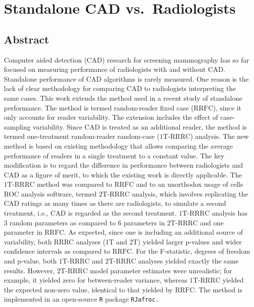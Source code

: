 \documentclass[
]{article}
\author{}
\date{\vspace{-2.5em}}
\begin{document}
{
\setcounter{tocdepth}{2}
\tableofcontents
}
\hypertarget{standalone-cad-radiologists}{%
\section{Standalone CAD vs.~Radiologists}\label{standalone-cad-radiologists}}

\hypertarget{standalone-cad-radiologists-abstract}{%
\subsection{Abstract}\label{standalone-cad-radiologists-abstract}}

Computer aided detection (CAD) research for screening mammography has so far focused on measuring performance of radiologists with and without CAD. Standalone performance of CAD algorithms is rarely measured. One reason is the lack of clear methodology for comparing CAD to radiologists interpreting the same cases. This work extends the method used in a recent study of standalone performance. The method is termed random-reader fixed case (\(\text{RRFC}\)), since it only accounts for reader variability. The extension includes the effect of case-sampling variability. Since CAD is treated as an additional reader, the method is termed one-treatment random-reader random-case (\(\text{1T-RRRC}\)) analysis. The new method is based on existing methodology that allows comparing the average performance of readers in a single treatment to a constant value. The key modification is to regard the difference in performance between radiologists and CAD as a figure of merit, to which the existing work is directly applicable. The \(\text{1T-RRRC}\) method was compared to \(\text{RRFC}\) and to an unorthodox usage of cells ROC analysis software, termed \(\text{2T-RRRC}\) analysis, which involves replicating the CAD ratings as many times as there are radiologists, to simulate a second treatment, i.e., CAD is regarded as the second treatment. \(\text{1T-RRRC}\) analysis has 3 random parameters as compared to 6 parameters in \(\text{2T-RRRC}\) and one parameter in \(\text{RRFC}\). As expected, since one is including an additional source of variability, both RRRC analyses (1T and 2T) yielded larger p-values and wider confidence intervals as compared to \(\text{RRFC}\). For the F-statistic, degrees of freedom and p-value, both \(\text{1T-RRRC}\) and \(\text{2T-RRRC}\) analyses yielded exactly the same results. However, \(\text{2T-RRRC}\) model parameter estimates were unrealistic; for example, it yielded zero for between-reader variance, whereas \(\text{1T-RRRC}\) yielded the expected non-zero value, identical to that yielded by \(\text{RRFC}\). The method is implemented in an open-source \texttt{R} package \texttt{RJafroc.}
\end{document}
